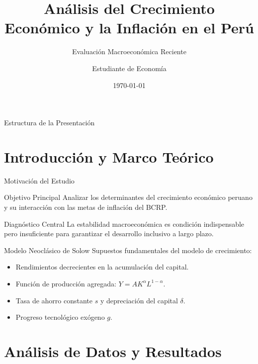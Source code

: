\documentclass[10pt]{beamer}
\title[Crecimiento e Inflación]{Análisis del Crecimiento Económico y la Inflación en el Perú}
\subtitle{Evaluación Macroeconómica Reciente}
\author[Estudiante PUCP]{Estudiante de Economía}
\institute[PUCP]{Pontificia Universidad Católica del Perú}
\date{\today}
\begin{document}
\begin{frame}
  \titlepage
\end{frame}

\begin{frame}{Estructura de la Presentación}
  \tableofcontents
\end{frame}

\section{Introducción y Marco Teórico}

\begin{frame}{Motivación del Estudio}
  \begin{block}{Objetivo Principal}
    Analizar los determinantes del crecimiento económico peruano y su interacción con las metas de inflación del BCRP.
  \end{block}

  \vspace{0.4cm}

  \begin{alertblock}{Diagnóstico Central}
    La estabilidad macroeconómica es condición indispensable pero insuficiente para garantizar el desarrollo inclusivo a largo plazo.
  \end{alertblock}
\end{frame}

\begin{frame}{Modelo Neoclásico de Solow}
  Supuestos fundamentales del modelo de crecimiento:
  \begin{itemize}[<+->]
    \item Rendimientos decrecientes en la acumulación del capital.
    \item Función de producción agregada: $Y = A K^\alpha L^{1-\alpha}$.
    \item Tasa de ahorro constante $s$ y depreciación del capital $\delta$.
    \item Progreso tecnológico exógeno $g$.
  \end{itemize}
\end{frame}

\section{Análisis de Datos y Resultados}
\end{document}
